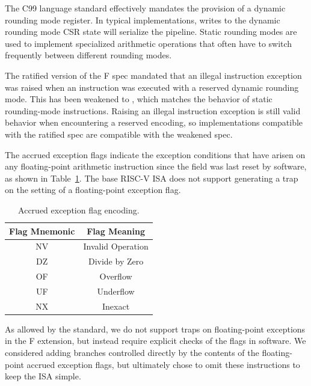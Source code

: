 \begin{commentary}
The C99 language standard effectively mandates the provision of a
dynamic rounding mode register.  In typical implementations, writes to
the dynamic rounding mode CSR state will serialize the pipeline.
Static rounding modes are used to implement specialized arithmetic
operations that often have to switch frequently between different
rounding modes.

The ratified version of the F spec mandated that an illegal
instruction exception was raised when an instruction was executed with
a reserved dynamic rounding mode.  This has been weakened to \unspecified,
which matches the behavior of static rounding-mode instructions.
Raising an illegal instruction exception is still valid behavior when
encountering a reserved encoding, so implementations compatible with
the ratified spec are compatible with the weakened spec.
\end{commentary}
 
The accrued exception flags indicate the exception conditions that
have arisen on any floating-point arithmetic instruction since the
field was last reset by software, as shown in Table~\ref{bitdef}.
The base RISC-V ISA
does not support generating a trap on the setting of a floating-point
exception flag.

\begin{table}[htp]
\begin{small}
\begin{center}
\begin{tabular}{cl}
\hline
\multicolumn{1}{|c|}{Flag Mnemonic} &
\multicolumn{1}{c|}{Flag Meaning} \\
\hline
\multicolumn{1}{|c|}{NV} &
\multicolumn{1}{c|}{Invalid Operation}\\
\hline
\multicolumn{1}{|c|}{DZ} &
\multicolumn{1}{c|}{Divide by Zero}\\
\hline
\multicolumn{1}{|c|}{OF} &
\multicolumn{1}{c|}{Overflow}\\
\hline
\multicolumn{1}{|c|}{UF} &
\multicolumn{1}{c|}{Underflow}\\
\hline
\multicolumn{1}{|c|}{NX} &
\multicolumn{1}{c|}{Inexact}\\
\hline
\end{tabular}
\end{center}
\end{small}
\caption{Accrued exception flag encoding.}
\label{bitdef}
\end{table}

\begin{commentary}
As allowed by the standard, we do not support traps on floating-point
exceptions in the F extension, but instead require explicit checks of the flags
in software.  We considered adding branches controlled directly by the
contents of the floating-point accrued exception flags, but ultimately chose
to omit these instructions to keep the ISA simple.
\end{commentary}

